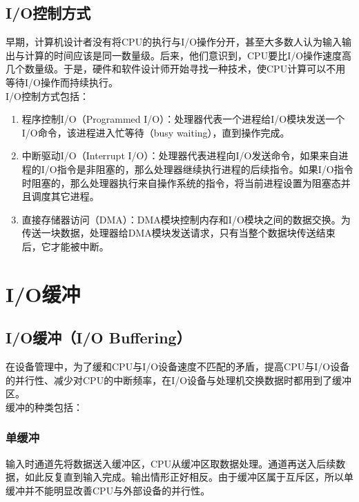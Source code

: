 \vspace{0.5cm}

\subsection{I/O控制方式}

早期，计算机设计者没有将CPU的执行与I/O操作分开，甚至大多数人认为输入输出与计算的时间应该是同一数量级。后来，他们意识到，CPU要比I/O操作速度高几个数量级。于是，硬件和软件设计师开始寻找一种技术，使CPU计算可以不用等待I/O操作而持续执行。\\

I/O控制方式包括：

\begin{enumerate}
    \item 程序控制I/O（Programmed I/O）：处理器代表一个进程给I/O模块发送一个I/O命令，该进程进入忙等待（busy waiting），直到操作完成。

    \item 中断驱动I/O（Interrupt I/O）：处理器代表进程向I/O发送命令，如果来自进程的I/O指令是非阻塞的，那么处理器继续执行进程的后续指令。如果I/O指令时阻塞的，那么处理器执行来自操作系统的指令，将当前进程设置为阻塞态并且调度其它进程。

    \item 直接存储器访问（DMA）：DMA模块控制内存和I/O模块之间的数据交换。为传送一块数据，处理器给DMA模块发送请求，只有当整个数据块传送结束后，它才能被中断。
\end{enumerate}

\newpage

\section{I/O缓冲}

\subsection{I/O缓冲（I/O Buffering）}

在设备管理中，为了缓和CPU与I/O设备速度不匹配的矛盾，提高CPU与I/O设备的并行性、减少对CPU的中断频率，在I/O设备与处理机交换数据时都用到了缓冲区。\\

缓冲的种类包括：

\subsubsection{单缓冲}

输入时通道先将数据送入缓冲区，CPU从缓冲区取数据处理。通道再送入后续数据，如此反复直到输入完成。输出情形正好相反。由于缓冲区属于互斥区，所以单缓冲并不能明显改善CPU与外部设备的并行性。

